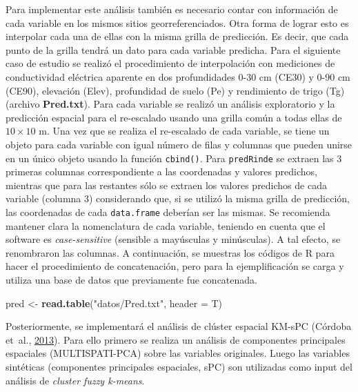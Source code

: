 \documentclass[11pt,b5paper,]{krantz}
\newenvironment{Shaded}{}{}
\newcommand{\DataTypeTok}[1]{\textcolor[rgb]{0.56,0.13,0.00}{#1}}
\newcommand{\KeywordTok}[1]{\textcolor[rgb]{0.00,0.44,0.13}{\textbf{#1}}}
\newcommand{\NormalTok}[1]{#1}
\newcommand{\StringTok}[1]{\textcolor[rgb]{0.25,0.44,0.63}{#1}}
\begin{document}
Para implementar este análisis también es necesario contar con información de cada variable en los mismos sitios georreferenciados. Otra forma de lograr esto es interpolar cada una de ellas con la misma grilla de predicción. Es decir, que cada punto de la grilla tendrá un dato para cada variable predicha. Para el siguiente caso de estudio se realizó el procedimiento de interpolación con mediciones de conductividad eléctrica aparente en dos profundidades 0-30 cm (CE30) y 0-90 cm (CE90), elevación (Elev), profundidad de suelo (Pe) y rendimiento de trigo (Tg) (archivo \textbf{Pred.txt}). Para cada variable se realizó un análisis exploratorio y la predicción espacial para el re-escalado usando una grilla común a todas ellas de \(10 \times 10\) m. Una vez que se realiza el re-escalado de cada variable, se tiene un objeto para cada variable con igual número de filas y columnas que pueden unirse en un único objeto usando la función \texttt{cbind()}. Para \texttt{predRinde} se extraen las 3 primeras columnas correspondiente a las coordenadas y valores predichos, mientras que para las restantes sólo se extraen los valores predichos de cada variable (columna 3) considerando que, si se utilizó la misma grilla de predicción, las coordenadas de cada \texttt{data.frame} deberían ser las mismas. Se recomienda mantener clara la nomenclatura de cada variable, teniendo en cuenta que el software es \emph{case-sensitive} (sensible a mayúsculas y minúsculas). A tal efecto, se renombraron las columnas. A continuación, se muestras los códigos de R para hacer el procedimiento de concatenación, pero para la ejemplificación se carga y utiliza una base de datos que previamente fue concatenada.

\begin{Shaded}
\begin{Highlighting}[]
\NormalTok{pred <-}\StringTok{ }\KeywordTok{read.table}\NormalTok{(}\StringTok{"datos/Pred.txt"}\NormalTok{, }
                   \DataTypeTok{header =}\NormalTok{ T)}
\end{Highlighting}
\end{Shaded}

Posteriormente, se implementará el análisis de clúster espacial KM-sPC (Córdoba et~al., \protect\hyperlink{ref-Cordoba2013}{2013}). Para ello primero se realiza un análisis de componentes principales espaciales (MULTISPATI-PCA) sobre las variables originales. Luego las variables sintéticas (componentes principales espaciales, sPC) son utilizadas como input del análisis de \emph{cluster fuzzy k-means}.
\end{document}
